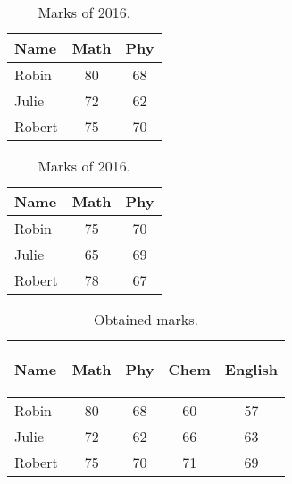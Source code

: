 \documentclass{article}
\begin{document}

\begin{table}[!hbt]
    \begin{minipage}[c]{0.4\linewidth}
        \centering
        \caption{Marks of 2015.}
        \label{1st_table}
        \begin{tabular}{|l|c|c|}
            \hline Name   & Math & Phy \\
            \hline Robin  & 80   & 68  \\
            \hline Julie  & 72   & 62  \\
            \hline Robert & 75   & 70  \\
            \hline
        \end{tabular}
    \end{minipage}\hfill
    \begin{minipage}[c]{0.4\linewidth}
        \centering
        \caption{Marks of 2016.}
        \label{2nd_table}
        \begin{tabular}{|l|c|c|}
            \hline Name   & Math & Phy \\
            \hline Robin  & 75   & 70  \\
            \hline Julie  & 65   & 69  \\
            \hline Robert & 78   & 67  \\
            \hline
        \end{tabular}
    \end{minipage}
\end{table}


\begin{table}[!hbt]
    \centering
    \caption{Obtained marks.}
    \begin{sideways}
        \begin{tabular}{|l|*{4}{c|}}
            \hline Name                        & \begin{sideways}Math\end{sideways} &
            \begin{sideways}Phy\end{sideways}  &
            \begin{sideways}Chem\end{sideways} &
            \begin{sideways}English\end{sideways}                                                  \\
            \hline Robin                       & 80                                 & 68 & 60 & 57 \\
            \hline Julie                       & 72                                 & 62 & 66 & 63 \\
            \hline Robert                      & 75                                 & 70 & 71 & 69 \\
            \hline
        \end{tabular}
    \end{sideways}
\end{table}
\end{document}
